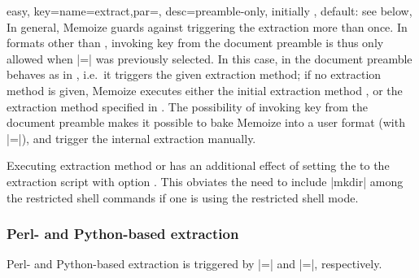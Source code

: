 \documentclass[a4paper,11pt]{article}
\begin{document}
\begin{doc}{easy,
    key={name=extract,par=,
      desc={preamble-only, initially , default: see below}},
  }
  In general, Memoize guards against triggering the extraction more than once.
  In formats other than , invoking key  from
  the document preamble is thus only allowed when
  |=| was previously selected.  In this
  case,  in the document preamble behaves as in
  , i.e.\ it triggers the given extraction method; if no
  extraction method is given, Memoize executes either the initial extraction
  method , or the extraction method specified in
  .  The possibility of invoking key  from
  the document preamble makes it possible to bake Memoize into a user format
  (with |=|), and trigger the internal
  extraction manually.

  Executing extraction method  or 
  has an additional effect of setting the  to the
  extraction script with option .  This
  obviates the need to include |mkdir| among the restricted shell commands if
  one is using the restricted shell mode.
\end{doc}

\subsubsection{Perl- and Python-based extraction}
\label{sec:ref:extraction-perl-python}

Perl- and Python-based extraction is triggered by
|=| and
|=|, respectively.
\end{document}
